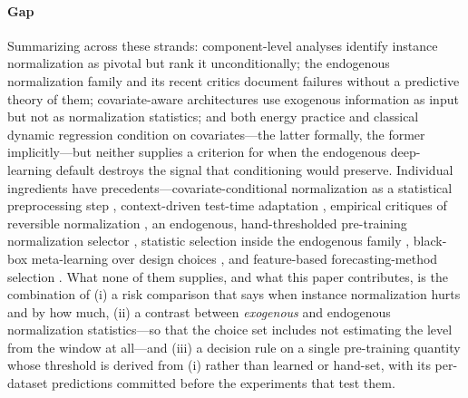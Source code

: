 \paragraph{Gap} Summarizing across these strands: component-level analyses identify instance normalization as pivotal but rank it unconditionally; the endogenous normalization family and its recent critics document failures without a predictive theory of them; covariate-aware architectures use exogenous information as input but not as normalization statistics; and both energy practice and classical dynamic regression condition on covariates---the latter formally, the former implicitly---but neither supplies a criterion for when the endogenous deep-learning default destroys the signal that conditioning would preserve. Individual ingredients have precedents---covariate-conditional normalization as a statistical preprocessing step \citep{gamakumara2023conditional}, context-driven test-time adaptation \citep{chen2024solid}, empirical critiques of reversible normalization \citep{role2026revin}, an endogenous, hand-thresholded pre-training normalization selector \citep{noise2025signal}, statistic selection inside the endogenous family \citep{han2024sin}, black-box meta-learning over design choices \citep{liang2025tsgym}, and feature-based forecasting-method selection \citep{talagala2023metalearning, monteromanso2020fforma}. What none of them supplies, and what this paper contributes, is the combination of (i) a risk comparison that says when instance normalization hurts and by how much, (ii) a contrast between \emph{exogenous} and endogenous normalization statistics---so that the choice set includes not estimating the level from the window at all---and (iii) a decision rule on a single pre-training quantity whose threshold is derived from (i) rather than learned or hand-set, with its per-dataset predictions committed before the experiments that test them.
